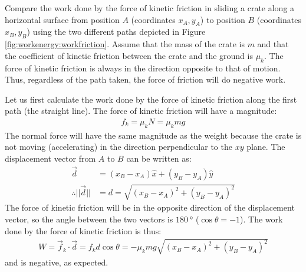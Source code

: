 \begin{example}{\label{ex:workenergy:workfriction}
Compare the work done by the force of kinetic friction in sliding a crate along a horizontal surface from position $A$ (coordinates $x_A, y_A$) to position $B$ (coordinates $x_B, y_B$) using the two different paths depicted in Figure \ref{fig:workenergy:workfriction}. Assume that the mass of the crate is $m$ and that the coefficient of kinetic friction between the crate and the ground is $\mu_k$.
}
The force of kinetic friction is always in the direction opposite to that of motion. Thus, regardless of the path taken, the force of friction will do negative work. 

Let us first calculate the work done by the force of kinetic friction along the first path (the straight line). The force of kinetic friction will have a magnitude:
\begin{align*}
f_k = \mu_k N = \mu_k mg
\end{align*}
The normal force will have the same magnitude as the weight because the crate is not moving (accelerating) in the direction perpendicular to the $xy$ plane.  The displacement vector from $A$ to $B$ can be written as:
\begin{align*}
\vec d &= (x_B-x_A)\hat x + (y_B-y_A) \hat y\\
\therefore ||\vec d|| &=d= \sqrt{(x_B-x_A)^2 + (y_B-y_A)^2}
\end{align*}  
The force of kinetic friction will be in the opposite direction of the displacement vector, so the angle between the two vectors is $\SI{180}{\degree}$ ($\cos\theta=-1$). The work done by the force of kinetic friction is thus:
\begin{align*}
W = \vec f_k \cdot\vec d = f_k d \cos\theta = -\mu_k mg\sqrt{(x_B-x_A)^2 + (y_B-y_A)^2}
\end{align*}
and is negative, as expected.


\end{example}
